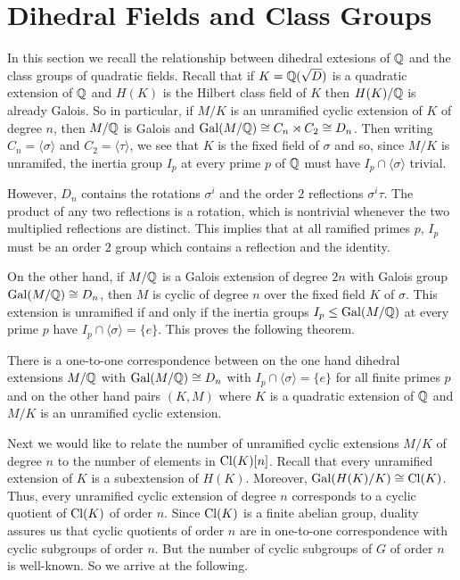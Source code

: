 \section{Dihedral Fields and Class Groups}\label{sec:classgroups}

In this section we recall the relationship between dihedral extesions of $\mathbb{Q}$
and the class groups of quadratic fields. Recall that if $K = \mathbb{Q}(\sqrt{D})$ is a
quadratic extension of $\mathbb{Q}$ and $H(K)$ is the Hilbert class field of $K$ then
$H(K)/\mathbb{Q}$ is already Galois. So in particular, if $M/K$ is an unramified cyclic
extension of $K$ of degree $n$, then $M/\mathbb{Q}$ is Galois and $\operatorname{Gal}(M/\mathbb{Q}) \cong C_n
\rtimes C_2 \cong D_n$.  Then writing $C_n = \langle \sigma \rangle$ and $C_2 =
\langle \tau \rangle$, we see that $K$ is the fixed field of $\sigma$ and so,
since $M/K$ is unramifed, the inertia group $I_p$ at every prime $p$ of $\mathbb{Q}$
must have $I_p \cap \langle \sigma \rangle$ trivial.

However, $D_n$ contains the rotations $\sigma^i$ and the order $2$ reflections
$\sigma^i\tau$.  The product of any two reflections is a rotation, which is
nontrivial whenever the two multiplied reflections are distinct. This implies
that at all ramified primes $p$, $I_p$ must be an order $2$ group which
contains a reflection and the identity.

On the other hand, if $M/\mathbb{Q}$ is a Galois extension of degree $2n$ with Galois
group $\operatorname{Gal}(M/\mathbb{Q}) \cong D_n$, then $M$ is cyclic of degree $n$ over the fixed
field $K$ of $\sigma$.  This extension is unramified if and only if the inertia
groups $I_p \leq \operatorname{Gal}(M/\mathbb{Q})$ at every prime $p$ have $I_p \cap \langle \sigma
\rangle = \{ e \}$. This proves the following theorem.

\begin{prop}\label{prop:nottoram}
  There is a one-to-one correspondence between on the one hand dihedral
extensions $M/\mathbb{Q}$ with $\operatorname{Gal}(M/\mathbb{Q}) \cong D_n$ with $I_p \cap \langle \sigma
\rangle = \{ e \}$ for all finite primes $p$ and on the other hand pairs $(K,
M)$ where $K$ is a quadratic extension of $\mathbb{Q}$ and $M/K$ is an unramified
cyclic extension.
\end{prop}

Next we would like to relate the number of unramified cyclic extensions $M/K$
of degree $n$ to the number of elements in $\operatorname{Cl}(K)[n]$. Recall that every
unramified extension of $K$ is a subextension of $H(K)$. Moreover,
$\operatorname{Gal}(H(K)/K) \cong \operatorname{Cl}(K)$. Thus, every unramified cyclic extension of degree
$n$ corresponds to a cyclic quotient of $\operatorname{Cl}(K)$ of order $n$. Since $\operatorname{Cl}(K)$
is a finite abelian group, duality assures us that cyclic quotients of order
$n$ are in one-to-one correspondence with cyclic subgroups of order $n$. But
the number of cyclic subgroups of $G$ of order $n$ is well-known. So we arrive
at the following.

